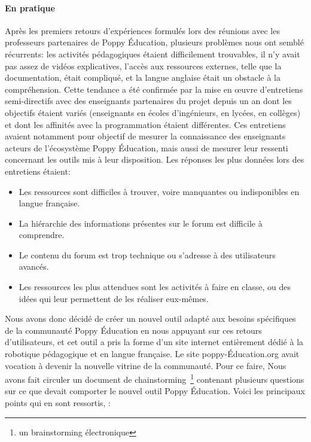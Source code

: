     \paragraph{En pratique}
        Après les premiers retours d'expériences formulés lors des réunions avec les professeurs partenaires de Poppy Éducation, plusieurs problèmes nous ont semblé récurrents: les activités pédagogiques étaient difficilement trouvables, il n'y avait pas assez de vidéos explicatives, l'accès aux ressources externes, telle que la documentation, était compliqué, et la langue anglaise était un obstacle à la compréhension.
        Cette tendance a été confirmée par la mise en œuvre d'entretiens semi-directifs avec des enseignants partenaires du projet depuis un an dont les objectifs étaient variés (enseignants en écoles d'ingénieurs, en lycées, en collèges) et dont les affinités avec la programmation étaient différentes. Ces entretiens avaient notamment pour objectif de mesurer la connaissance des enseignants acteurs de l'écosystème Poppy Éducation, mais aussi de mesurer leur ressenti concernant les outils mis à leur disposition.
        Les réponses les plus données lors des entretiens étaient:
        \begin{itemize}\myItemStyle
            \item Les ressources sont difficiles à trouver, voire manquantes ou indisponibles en langue française.
            \item La hiérarchie des informations présentes sur le forum est difficile à comprendre.
            \item Le contenu du forum est trop technique ou s'adresse à des utilisateurs avancés.
            \item Les ressources les plus attendues sont les activités à faire en classe, ou des idées qui leur permettent de les réaliser eux-mêmes.
        \end{itemize}\par%
        Nous avons donc décidé de créer un nouvel outil adapté aux besoins spécifiques de la communauté Poppy Éducation en nous appuyant sur ces retours d'utilisateurs, et cet outil a pris la forme d'un site internet entièrement dédié à la robotique pédagogique et en langue française. Le site poppy-Éducation.org avait vocation à devenir la nouvelle vitrine de la communauté.
        Pour ce faire, Nous avons fait circuler un document de chainstorming~\footnote{un brainstorming électronique}
        contenant plusieurs questions sur ce que devait comporter le nouvel outil Poppy Éducation.
        Voici les principaux points qui en sont ressortis, : 
